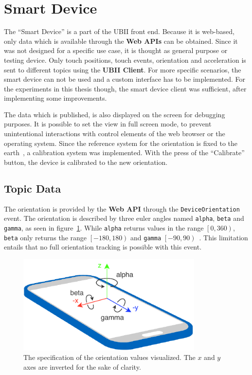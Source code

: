 \section{Smart Device}\label{section:smart-device}

The \enquote{Smart Device} is a part of the \ac{UBII} front end. Because it is web-based, only data which is available through the \textbf{Web \acp{API}} can be obtained. Since it was not designed for a specific use case, it is thought as general purpose or testing device. Only touch positions, touch events, orientation and acceleration is sent to different topics using the \textbf{\ac{UBII} Client}. For more specific scenarios, the smart device can not be used and a custom interface has to be implemented. For the experiments in this thesis though, the smart device client was sufficient, after implementing some improvements.

The data which is published, is also displayed on the screen for debugging purposes. It is possible to set the view in full screen mode, to prevent unintentional interactions with control elements of the web browser or the operating system. Since the reference system for the orientation is fixed to the earth~\cite[Chapter~4.1]{DevicesandSensorsWorkingGroup.2019}, a calibration system was implemented. With the press of the \enquote{Calibrate} button, the device is calibrated to the new orientation.


\subsection{Topic Data}\label{subsection:topic-data}

The orientation is provided by the \textbf{Web API} through the \lstinline{DeviceOrientation} event. The orientation is described by three euler angles named \lstinline{alpha}, \lstinline{beta} and \lstinline{gamma}, as seen in figure~\ref{fig:webapi-device-orientation}.
While \lstinline{alpha} returns values in the range \(\left[0, 360\right)\), \lstinline{beta} only returns the range \(\left[-180, 180\right)\) and \lstinline{gamma} \(\left[-90, 90\right)\)~\cite[Chapter~4.1]{DevicesandSensorsWorkingGroup.2019}.
This limitation entails that no full orientation tracking is possible with this event. 

\begin{figure}[htpb]
  \centering
  \includegraphics[height=5cm]{figures/webapi_device_orientation.pdf}
  \caption[Device Orientation]{The specification of the orientation values visualized. The \(x\) and \(y\) axes are inverted for the sake of clarity.}\label{fig:webapi-device-orientation}
\end{figure}

